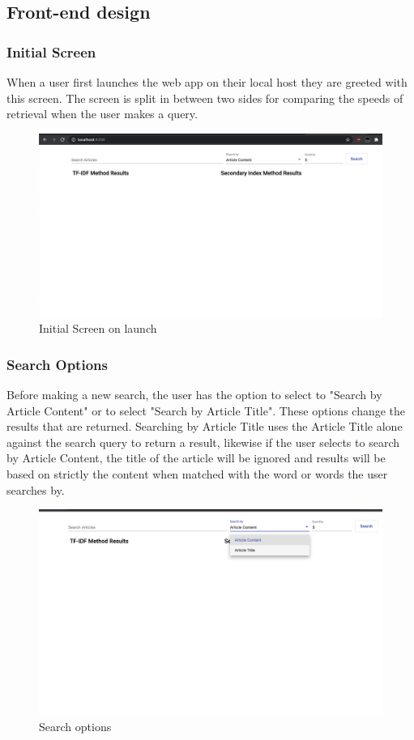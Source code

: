\documentclass{article}
\begin{document}
\subsection{Front-end design}
\subsubsection{Initial Screen}
When a user first launches the web app on their local host they are greeted with this screen.
The screen is split in between two sides for comparing the speeds of retrieval when the user makes a query.
\begin{figure}[htp]
    \centering
    \includegraphics[width=15cm]{InitialScreen.png}
    \caption{Initial Screen on launch}
\end{figure}
\subsubsection{Search Options}
Before making a new search, the user has the option to select to "Search by Article Content" or to select "Search by Article Title". These options change the results that are returned. Searching by Article Title uses the Article Title alone against the search query to return a result, likewise if the user selects to search by Article Content, the title of the article will be ignored and results will be based on strictly the content when matched with the word or words the user searches by.
\begin{figure}[htp]
    \centering
    \includegraphics[width=15cm]{SearchByDrop.png}
    \caption{Search options}
\end{figure}
\end{document}
